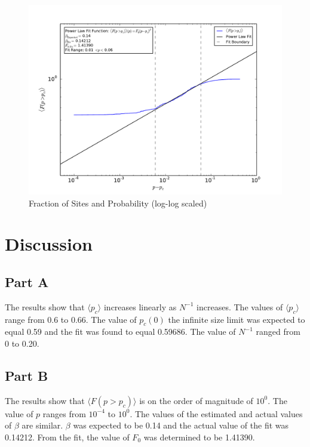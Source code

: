 \documentclass[12pt]{article}
\begin{document}
\begin{figure}[!h]
	\includegraphics[width=1\textwidth]{../output/plots_for_paper/F_ave_vs_p.pdf}
	\caption{Fraction of Sites and Probability (log-log scaled)}
	\label{fig:3}
\end{figure}
\clearpage

\section{Discussion}

\subsection{Part A}
\indent \indent The results show that $\langle p_c\rangle$ increases linearly as $N^{-1}$ increases. The values of $\langle p_c\rangle$ range from 0.6 to 0.66. The value of $p_c(0)$ the infinite size limit was expected to equal 0.59 and the fit was found to equal 0.59686. The value of $N^{-1}$ ranged from 0 to 0.20.

\subsection{Part B}
\indent \indent The results show that $\langle F(p>p_c) \rangle$ is on the order of magnitude of $10^0$. The value of $p$ ranges from $10^{-4}$ to $10^0$. The values of the estimated and actual values of $\beta$ are similar. $\beta$ was expected to be 0.14 and the actual value of the fit was 0.14212. From the fit, the value of $F_0$ was determined to be 1.41390.
\end{document}

